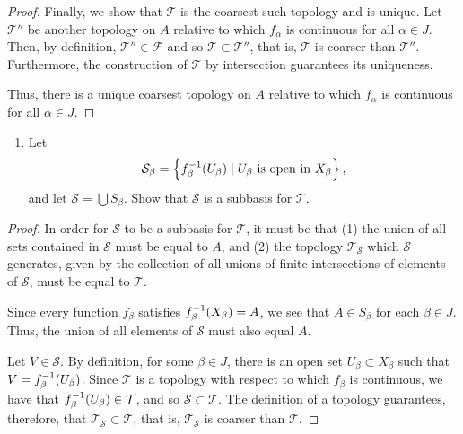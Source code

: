 \begin{solution}
\begin{proof}
        Finally, we show that $\mathcal{T}$ is the coarsest such topology and is unique.
        Let $\mathcal{T}''$ be another topology on $A$ relative to which $f_\alpha$ is continuous for all $\alpha \in J$.
        Then, by definition, $\mathcal{T}'' \in \mathcal{F}$ and so $\mathcal{T} \subset \mathcal{T}''$, that is, $\mathcal{T}$ is coarser than $\mathcal{T}''$.
        Furthermore, the construction of $\mathcal{T}$ by intersection guarantees its uniqueness.

        Thus, there is a unique coarsest topology on $A$ relative to which $f_\alpha$ is continuous for all $\alpha \in J$. 
    \end{proof}
    \bigskip

    \begin{enumerate}[label={(\alph*)}, align=left, leftmargin=\parindent, listparindent=\parindent, labelwidth=0pt, itemindent=!]
        \addtocounter{enumi}{1} 
        \item Let
        \begin{equation*}
            \mathcal{S}_\beta = \left\{f_\beta^{-1}(U_\beta) \mid U_\beta \text{ is open in } X_\beta\right\},
        \end{equation*}
        and let $\mathcal{S} = \bigcup S_\beta$.
        Show that $\mathcal{S}$ is a subbasis for $\mathcal{T}$.
    \end{enumerate}
    \begin{proof}
        In order for $\mathcal{S}$ to be a subbasis for $\mathcal{T}$, it must be that (1) the union of all sets contained in $\mathcal{S}$ must be equal to $A$, and (2) the topology $\mathcal{T}_\mathcal{S}$ which $\mathcal{S}$ generates, given by the collection of all unions of finite intersections of elements of $\mathcal{S}$, must be equal to $\mathcal{T}$.

        Since every function $f_\beta$ satisfies $f_\beta^{-1}(X_\beta) = A$, we see that $A \in S_\beta$ for each $\beta \in J$.
        Thus, the union of all elements of $\mathcal{S}$ must also equal $A$.
    
        Let $V \in \mathcal{S}$.
        By definition, for some $\beta \in J$, there is an open set $U_\beta \subset X_\beta$ such that $V = f_\beta^{-1}(U_\beta)$.
        Since $\mathcal{T}$ is a topology with respect to which $f_\beta$ is continuous, we have that $f_\beta^{-1}(U_\beta) \in \mathcal{T}$, and so $\mathcal{S} \subset \mathcal{T}$.
        The definition of a topology guarantees, therefore, that $\mathcal{T}_{\mathcal{S}} \subset \mathcal{T}$, that is, $\mathcal{T}_\mathcal{S}$ is coarser than $\mathcal{T}$.
    

\end{proof}
\end{solution}
